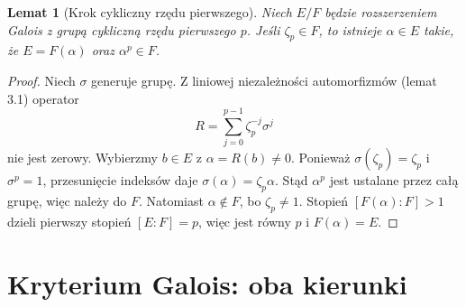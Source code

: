 \documentclass[11pt,a4paper,oneside]{book}
\numberwithin{equation}{section}
\theoremstyle{plain}
\newtheorem{lemat}[twierdzenie]{Lemat}
\theoremstyle{definition}
\theoremstyle{remark}
\begin{document}
\begin{lemat}[Krok cykliczny rzędu pierwszego]
Niech $E/F$ będzie rozszerzeniem Galois z grupą cykliczną rzędu pierwszego $p$. Jeśli $\zeta_p\in F$, to istnieje $\alpha\in E$ takie, że $E=F(\alpha)$ oraz $\alpha^p\in F$.
\end{lemat}
\begin{proof}
Niech $\sigma$ generuje grupę. Z liniowej niezależności automorfizmów (lemat 3.1) operator
\[
R=\sum_{j=0}^{p-1}\zeta_p^{-j}\sigma^j
\]
nie jest zerowy. Wybierzmy $b\in E$ z $\alpha=R(b)\ne0$. Ponieważ $\sigma(\zeta_p)=\zeta_p$ i $\sigma^p=1$, przesunięcie indeksów daje $\sigma(\alpha)=\zeta_p\alpha$. Stąd $\alpha^p$ jest ustalane przez całą grupę, więc należy do $F$. Natomiast $\alpha\notin F$, bo $\zeta_p\ne1$. Stopień $[F(\alpha):F]>1$ dzieli pierwszy stopień $[E:F]=p$, więc jest równy $p$ i $F(\alpha)=E$.
\end{proof}

\section{Kryterium Galois: oba kierunki}
\end{document}
